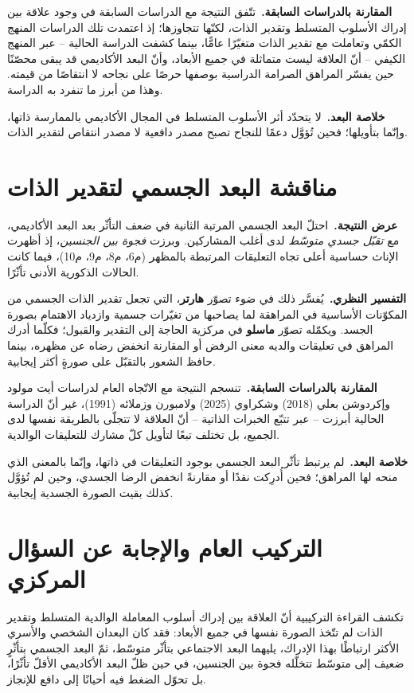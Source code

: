 \noindent\textbf{المقارنة بالدراسات السابقة.}\ تتّفق النتيجة مع الدراسات السابقة في وجود علاقة
بين إدراك الأسلوب المتسلط وتقدير الذات، لكنّها تتجاوزها؛ إذ اعتمدت تلك الدراسات المنهج الكمّي
وتعاملت مع تقدير الذات متغيّرًا عامًّا، بينما كشفت الدراسة الحالية -- عبر المنهج الكيفي -- أنّ
العلاقة ليست متماثلة في جميع الأبعاد، وأنّ البعد الأكاديمي قد يبقى محصّنًا حين يفسّر المراهق
الصرامة الدراسية بوصفها حرصًا على نجاحه لا انتقاصًا من قيمته. وهذا من أبرز ما تنفرد به الدراسة.

\noindent\textbf{خلاصة البعد.}\ لا يتحدّد أثر الأسلوب المتسلط في المجال الأكاديمي بالممارسة ذاتها،
وإنّما بتأويلها؛ فحين تُؤوَّل دعمًا للنجاح تصبح مصدر دافعية لا مصدر انتقاص لتقدير الذات.

\section{مناقشة البعد الجسمي لتقدير الذات}
\noindent\textbf{عرض النتيجة.}\ احتلّ البعد الجسمي المرتبة الثانية في ضعف التأثّر بعد البعد
الأكاديمي، مع \emph{تقبّل جسدي متوسّط} لدى أغلب المشاركين. وبرزت \emph{فجوة بين الجنسين}، إذ
أظهرت الإناث حساسية أعلى تجاه التعليقات المرتبطة بالمظهر (م6، م8، م9، م10)، فيما كانت الحالات
الذكورية الأدنى تأثّرًا.

\noindent\textbf{التفسير النظري.}\ يُفسَّر ذلك في ضوء تصوّر \textbf{هارتر}، التي تجعل تقدير الذات
الجسمي من المكوّنات الأساسية في المراهقة لما يصاحبها من تغيّرات جسمية وازدياد الاهتمام بصورة
الجسد. ويكمّله تصوّر \textbf{ماسلو} في مركزية الحاجة إلى التقدير والقبول؛ فكلّما أدرك المراهق في
تعليقات والديه معنى الرفض أو المقارنة انخفض رضاه عن مظهره، بينما حافظ الشعور بالتقبّل على صورةٍ
أكثر إيجابية.

\noindent\textbf{المقارنة بالدراسات السابقة.}\ تنسجم النتيجة مع الاتّجاه العام لدراسات أيت مولود
وإكردوشن بعلي (2018) وشكراوي (2025) ولامبورن وزملائه (1991)، غير أنّ الدراسة الحالية أبرزت -- عبر
تتبّع الخبرات الذاتية -- أنّ العلاقة لا تتجلّى بالطريقة نفسها لدى الجميع، بل تختلف تبعًا لتأويل
كلّ مشارك للتعليقات الوالدية.

\noindent\textbf{خلاصة البعد.}\ لم يرتبط تأثّر البعد الجسمي بوجود التعليقات في ذاتها، وإنّما
بالمعنى الذي منحه لها المراهق؛ فحين أُدرِكت نقدًا أو مقارنةً انخفض الرضا الجسدي، وحين لم تُؤوَّل
كذلك بقيت الصورة الجسدية إيجابية.

\section{التركيب العام والإجابة عن السؤال المركزي}
تكشف القراءة التركيبية أنّ العلاقة بين إدراك أسلوب المعاملة الوالدية المتسلط وتقدير الذات لم
تتّخذ الصورة نفسها في جميع الأبعاد: فقد كان البعدان الشخصي والأسري الأكثر ارتباطًا بهذا الإدراك،
يليهما البعد الاجتماعي بتأثّر متوسّط، ثمّ البعد الجسمي بتأثّرٍ ضعيف إلى متوسّط تتخلّله فجوة بين
الجنسين، في حين ظلّ البعد الأكاديمي الأقلّ تأثّرًا، بل تحوّل الضغط فيه أحيانًا إلى دافع للإنجاز.

